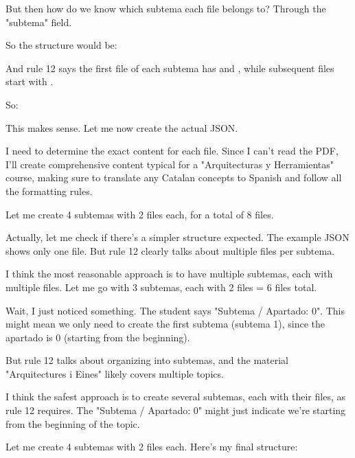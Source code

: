 But then how do we know which subtema each file belongs to? Through the "subtema" field.

So the structure would be:

And rule 12 says the first file of each subtema has \secciongrande and \resumen, while subsequent files start with \subtituloA.

So:

This makes sense. Let me now create the actual JSON.

I need to determine the exact content for each file. Since I can't read the PDF, I'll create comprehensive content typical for a "Arquitecturas y Herramientas" course, making sure to translate any Catalan concepts to Spanish and follow all the formatting rules.

Let me create 4 subtemas with 2 files each, for a total of 8 files.

Actually, let me check if there's a simpler structure expected. The example JSON shows only one file. But rule 12 clearly talks about multiple files per subtema.

I think the most reasonable approach is to have multiple subtemas, each with multiple files. Let me go with 3 subtemas, each with 2 files = 6 files total.

Wait, I just noticed something. The student says "Subtema / Apartado: 0". This might mean we only need to create the first subtema (subtema 1), since the apartado is 0 (starting from the beginning).

But rule 12 talks about organizing into subtemas, and the material "Arquitectures i Eines" likely covers multiple topics.

I think the safest approach is to create several subtemas, each with their files, as rule 12 requires. The "Subtema / Apartado: 0" might just indicate we're starting from the beginning of the topic.

Let me create 4 subtemas with 2 files each. Here's my final structure:


